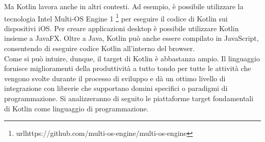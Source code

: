 Ma Kotlin lavora anche in altri contesti. Ad esempio, è possibile utilizzare la tecnologia Intel Multi-OS Engine 1 \footnote{url{https://github.com/multi-os-engine/multi-os-engine}} per eseguire il codice di Kotlin sui dispositivi iOS. Per creare applicazioni desktop è possibile utilizzare Kotlin insieme a JavaFX. Oltre a Java, Kotlin può anche essere compilato in JavaScript, consentendo di eseguire codice Kotlin all'interno del browser.\\
Come si può intuire, dunque, il target di Kotlin è abbastanza ampio. Il linguaggio fornisce miglioramenti della produttività a tutto tondo per tutte le attività che vengono svolte durante il processo di sviluppo e dà un ottimo livello di integrazione con librerie che supportano domini specifici o paradigmi di programmazione. Si analizzeranno di seguito le piattaforme target fondamentali di Kotlin come linguaggio di programmazione.\\

